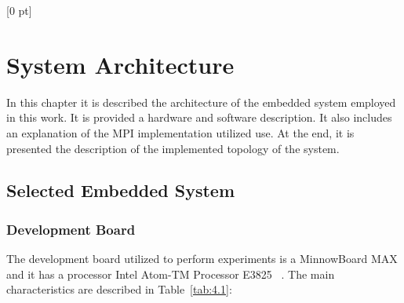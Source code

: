 \titlespacing{\chapter}{0 pt}{30 pt}{50 pt}[0 pt]
\titleformat{\section}{\Large\bfseries}{\thesection}{0 pt}{\hspace{30 pt}}
\titleformat{\subsection}{\large\bfseries}{\thesubsection}{0 pt}{\hspace{30 pt}}
\pagestyle{fancy}
\fancyhead[LO,LE]{\footnotesize\emph{\leftmark}}
\fancyhead[RO,RE]{\thepage}
\fancyfoot[CO,CE]{}

\chapter{System Architecture}

\normalsize
\noindent
In this chapter it is described the architecture of the embedded system
employed in this work. It is provided a hardware and software description.
It also includes an explanation of the MPI implementation utilized 
use. At the end, it is presented the description of the implemented topology of
the system.

\section{Selected Embedded System}
\noindent

\subsection{Development Board} The development board utilized to perform
experiments is a MinnowBoard MAX \cite{minnowboard} and it has a processor
Intel Atom-TM Processor E3825 \textregistered\ \cite{E3825}. The main characteristics are
described in Table~\ref{tab:4.1}:

